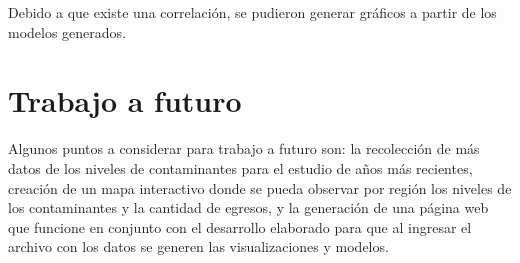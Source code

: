 Debido a que existe una correlación, se pudieron generar gráficos a partir de los modelos generados.

\clearpage


\section{Trabajo a futuro}
Algunos puntos a considerar para trabajo a futuro son: la recolección de más datos de los niveles de contaminantes para el estudio de años más recientes, creación de un mapa interactivo donde se pueda observar por región los niveles de los contaminantes y la cantidad de egresos, y la generación de una página web que funcione en conjunto con el desarrollo elaborado para que al ingresar el archivo con los datos se generen las visualizaciones y modelos.